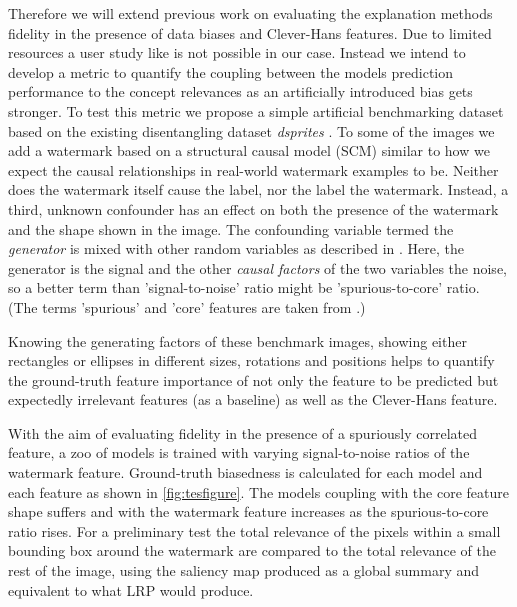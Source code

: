 Therefore we will extend previous work on evaluating the explanation methods fidelity in the presence of data biases and Clever-Hans features. Due to limited resources a user study like \cite{Sixt2022} is not possible in our case. Instead we intend to develop a metric to quantify the coupling between the models prediction performance to the concept relevances as an artificially introduced bias gets stronger. To test this metric we propose a simple artificial benchmarking dataset based on the existing disentangling dataset \textit{dsprites} \cite{dsprites17}. To some of the images we add a watermark based on a structural causal model (SCM) similar to how we expect the causal relationships in real-world watermark examples to be. Neither does the watermark itself cause the label, nor the label the watermark. Instead, a third, unknown confounder has an effect on both the presence of the watermark and the shape shown in the image. The confounding variable termed the \textit{generator} is mixed with other random variables as described in \cite{Clark2023}. Here, the generator is the signal and the other \textit{causal factors} of the two variables the noise, so a better term than 'signal-to-noise' ratio might be 'spurious-to-core' ratio.
(The terms 'spurious' and 'core' features are taken from \cite{Singla2022}.) 

Knowing the generating factors of these benchmark images, showing either rectangles or ellipses in different sizes, rotations and positions helps to quantify the ground-truth feature importance of not only the feature to be predicted but expectedly irrelevant features (as a baseline) as well as the Clever-Hans feature. 

With the aim of evaluating fidelity in the presence of a spuriously correlated feature, a zoo of models is trained with varying signal-to-noise ratios of the watermark feature. Ground-truth biasedness is calculated for each model and each feature as shown in \cref{fig:tesfigure}. The models coupling with the core feature shape suffers and with the watermark feature increases as the spurious-to-core ratio rises. 
For a preliminary test the total relevance of the pixels within a small bounding box around the watermark are compared to the total relevance of the rest of the image, using the saliency map produced as a global summary and equivalent to what LRP would produce. 

